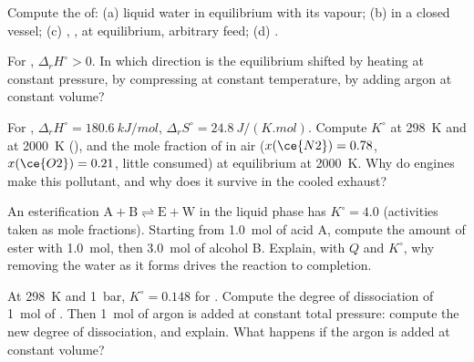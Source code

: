 \begin{exercise}[$\star$]\label{exo:b2:equilibrium-shifts:3}
Compute the  of: (a) liquid water in equilibrium with its vapour;
(b)  in a closed vessel; (c) ,
,  at equilibrium, arbitrary feed; (d) .
\end{exercise}

\begin{exercise}[$\star$]\label{exo:b2:equilibrium-shifts:4}
For , $\Delta_r H^\circ > 0$. In which direction is the
equilibrium shifted by heating at constant pressure, by compressing at
constant temperature, by adding argon at constant volume?
\end{exercise}

\begin{exercise}[$\star\star$]\label{exo:b2:equilibrium-shifts:5}
For , $\Delta_r H^\circ = \qty{180.6}{kJ/mol}$,
$\Delta_r S^\circ = \qty{24.8}{J/(K.mol)}$. Compute $K^\circ$ at \qty{298}{K}
and at \qty{2000}{K} (), and the mole fraction of
 in air ($x(\ce{N2}) = 0.78$, $x(\ce{O2}) = 0.21$, little consumed) at
equilibrium at \qty{2000}{K}. Why do engines make this pollutant, and why
does it survive in the cooled exhaust?
\end{exercise}

\begin{exercise}[$\star\star$]\label{exo:b2:equilibrium-shifts:6}
An esterification $\mathrm{A + B \rightleftharpoons E + W}$ in the liquid phase
has $K^\circ = 4.0$ (activities taken as mole fractions). Starting from
\qty{1.0}{mol} of acid A, compute the amount of ester with \qty{1.0}{mol}, then
\qty{3.0}{mol} of alcohol B. Explain, with $Q$ and $K^\circ$, why removing the
water as it forms drives the reaction to completion.
\end{exercise}

\begin{exercise}[$\star\star$]\label{exo:b2:equilibrium-shifts:7}
At \qty{298}{K} and \qty{1}{bar}, $K^\circ = 0.148$ for .
Compute the degree of dissociation of \qty{1}{mol} of . Then
\qty{1}{mol} of argon is added at constant total pressure: compute the new
degree of dissociation, and explain. What happens if the argon is added at
constant volume?
\end{exercise}

